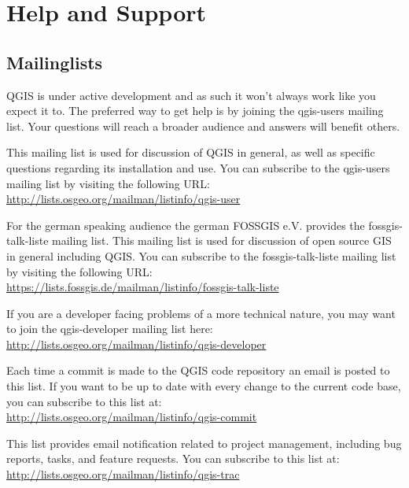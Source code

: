 
\chapter{Help and Support}\label{label_helpsupport}


\section{Mailinglists}
QGIS is under active development and as such it won't always work like
you expect it to. The preferred way to get help is by joining the qgis-users
mailing list. Your questions will reach a broader audience and answers will
benefit others. 

This mailing list is used for discussion of QGIS in general, as well as
specific questions regarding its installation and use. You can subscribe to
the qgis-users mailing list by visiting the following URL: \\
\url{http://lists.osgeo.org/mailman/listinfo/qgis-user}

For the german speaking audience the german FOSSGIS e.V. provides the
fossgis-talk-liste mailing list. This mailing list is used for discussion of
open source GIS in general including QGIS. You can subscribe to the
fossgis-talk-liste mailing list by visiting the following URL: \\
\url{https://lists.fossgis.de/mailman/listinfo/fossgis-talk-liste}

If you are a developer facing problems of a more technical nature, you may
want to join the qgis-developer mailing list here:\\
\url{http://lists.osgeo.org/mailman/listinfo/qgis-developer}

Each time a commit is made to the QGIS code repository an email is posted to
this list. If you want to be up to date with every change to the current code
base, you can subscribe to this list at:\\
\url{http://lists.osgeo.org/mailman/listinfo/qgis-commit}

This list provides email notification related to project management,
including bug reports, tasks, and feature requests. You can subscribe to this
list at:\\
\url{http://lists.osgeo.org/mailman/listinfo/qgis-trac}

